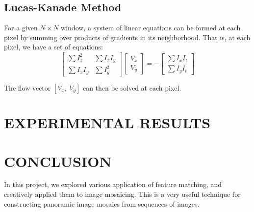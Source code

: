 \documentclass[letterpaper, 10 pt, conference]{ieeeconf}
\begin{document}
\subsection{Lucas-Kanade Method}
For a given $N\times N$ window, a system of linear equations can be formed at each pixel by summing over products of gradients in its neighborhood. That is, at each pixel, we have a set of equations:
\begin{equation}
\left[ \begin{array}{cc}
\sum I^2_x & \sum I_xI_y\\
\sum I_xI_y & \sum I^2_y
\end{array} \right] \left[ \begin{array}{c}
V_x\\
V_y
\end{array} \right]= -\left[ \begin{array}{c}
\sum I_xI_t\\
\sum I_yI_t
\end{array} \right]
\end{equation}

The flow vector $[V_x, \ V_y]$ can then be solved at each pixel.
\section{EXPERIMENTAL RESULTS}



\section{CONCLUSION}
In this project, we explored various application of feature matching, and creatively applied them to image mosaicing. This is a very useful technique for constructing panoramic image mosaics from sequences of images.
\vfill
\end{document}
